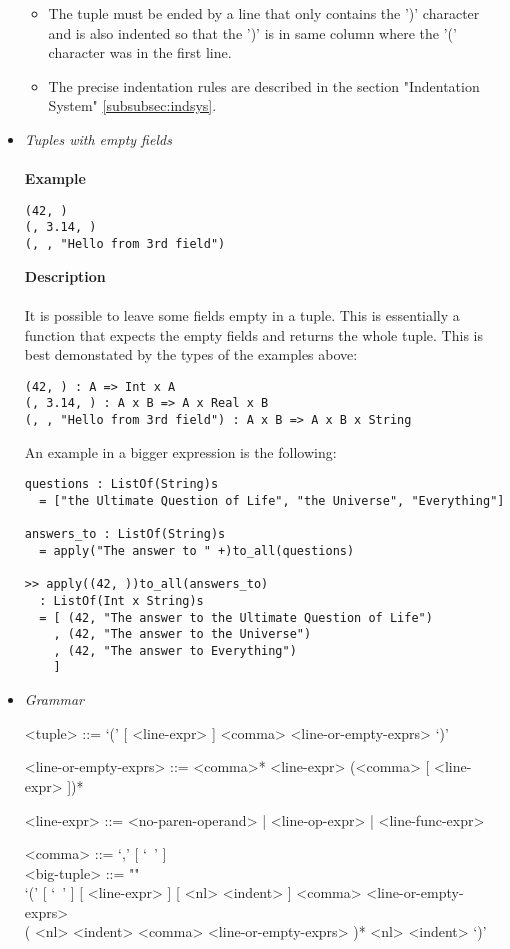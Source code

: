 \documentclass{article}
\begin{document}
\begin{itemize}
\begin{itemize}
\item
The tuple must be ended by a line that only contains the ')' character and is 
also indented so that the ')' is in same column where the '(' character was in
the first line.

\item
The precise indentation rules are described in the section
"Indentation System" \ref{subsubsec:indsys}.
\end{itemize}

\item \textit{Tuples with empty fields}
\\\\
\textbf{Example}
\begin{verbatim}
(42, )
(, 3.14, )
(, , "Hello from 3rd field")
\end{verbatim}

\textbf{Description}\\\\
It is possible to leave some fields empty in a tuple. This is essentially
a function that expects the empty fields and returns the whole tuple. This is
best demonstated by the types of the examples above:
\begin{verbatim}
(42, ) : A => Int x A
(, 3.14, ) : A x B => A x Real x B
(, , "Hello from 3rd field") : A x B => A x B x String
\end{verbatim}
An example in a bigger expression is the following:
\begin{verbatim}
questions : ListOf(String)s
  = ["the Ultimate Question of Life", "the Universe", "Everything"]

answers_to : ListOf(String)s
  = apply("The answer to " +)to_all(questions)

>> apply((42, ))to_all(answers_to)
  : ListOf(Int x String)s
  = [ (42, "The answer to the Ultimate Question of Life")
    , (42, "The answer to the Universe")
    , (42, "The answer to Everything")
    ]
\end{verbatim}

\item \textit{Grammar}
\begin{grammar}
<tuple> ::= `(' [ <line-expr> ] <comma> <line-or-empty-exprs> `)'

<line-or-empty-exprs> ::=
<comma>* <line-expr> (<comma> [ <line-expr> ])*

<line-expr> ::= <no-paren-operand> | <line-op-expr> | <line-func-expr>

<comma> ::= `,' [ `\ ' ]
\\

<big-tuple> ::= ""\\
`(' [ `\ ' ]  [ <line-expr> ] [ <nl> <indent> ] <comma> <line-or-empty-exprs> \\
( <nl> <indent> <comma> <line-or-empty-exprs> )* 
<nl> <indent> `)'
\end{grammar}

\end{itemize}
\end{document}
